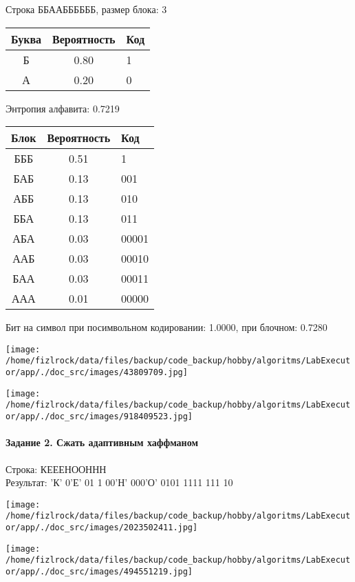 \documentclass[a4paper, 12pt]{article}
\begin{document}
Строка ББААББББББ, размер блока: 3
\begin{center}
 \begin{tabular}{ |c|c|l| } 
  \hline
     Буква & Вероятность & Код\\ \hline
Б & 0.80 & 1\\\hline
А & 0.20 & 0
\\ \hline \end{tabular}
\end{center}
Энтропия алфавита: 0.7219
\begin{center}
 \begin{tabular}{ |c|c|l| } 
  \hline
     Блок & Вероятность & Код\\ \hline
БББ & 0.51 & 1\\\hline
БАБ & 0.13 & 001\\\hline
АББ & 0.13 & 010\\\hline
ББА & 0.13 & 011\\\hline
АБА & 0.03 & 00001\\\hline
ААБ & 0.03 & 00010\\\hline
БАА & 0.03 & 00011\\\hline
ААА & 0.01 & 00000
\\ \hline \end{tabular}
\end{center}
Бит на символ при посимвольном кодировании: 1.0000, при блочном: 0.7280

\texttt{[image: /home/fizlrock/data/files/backup/code\_backup/hobby/algoritms/LabExecutor/app/./doc\_src/images/43809709.jpg]}

\texttt{[image: /home/fizlrock/data/files/backup/code\_backup/hobby/algoritms/LabExecutor/app/./doc\_src/images/918409523.jpg]}
\pagebreak
\paragraph{Задание 2. Сжать адаптивным хаффманом\\}

Строка: 
КЕЕЕНООННН\\
Результат: 'К' 0'Е' 01 1 00'Н' 000'О' 0101 1111 111 10

\texttt{[image: /home/fizlrock/data/files/backup/code\_backup/hobby/algoritms/LabExecutor/app/./doc\_src/images/2023502411.jpg]}

\texttt{[image: /home/fizlrock/data/files/backup/code\_backup/hobby/algoritms/LabExecutor/app/./doc\_src/images/494551219.jpg]}
\end{document}
